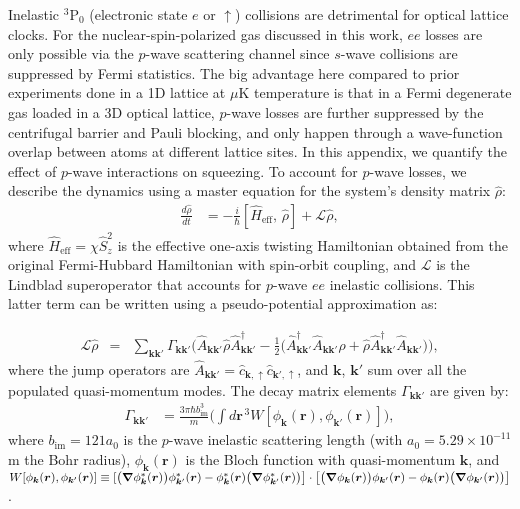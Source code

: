\documentclass[aps,prx,superscriptaddress,notitlepage,twocolumn,longbibliography]{revtex4-1}
\newcommand{\up}{\uparrow}
\begin{document}
Inelastic $^{3}\text{P}_{0}$ (electronic state $e$ or $\up$) collisions are detrimental for optical lattice clocks. For the  nuclear-spin-polarized gas discussed in this work, $ee$ losses are only possible via the $p$-wave scattering channel since $s$-wave collisions are suppressed by Fermi statistics. The big advantage here compared to  prior experiments done in a 1D lattice at $\mu$K temperature\cite{martin2013quantum} is that in a Fermi  degenerate  gas loaded in a 3D optical lattice, $p$-wave losses are further suppressed by the centrifugal barrier and Pauli blocking, and only happen through a wave-function overlap between atoms at different lattice sites.  In this appendix, we quantify the effect of $p$-wave interactions on squeezing. To account for $p$-wave losses, we describe the dynamics  using a master equation for the system's density matrix $\hat{\rho}$:
\begin{align}
\frac{d\hat{\rho}}{dt}&=-\frac{i}{\hbar}[\hat{H}_{\text{eff}},\,\hat{\rho}]+\mathcal{L}\hat{\rho}, 
\end{align}
where $\hat{H}_{\text{eff}}=\chi\hat{S}_z^2$ is the effective one-axis twisting Hamiltonian obtained from  the original Fermi-Hubbard Hamiltonian with spin-orbit coupling, and $\mathcal{L}$ is the Lindblad superoperator that accounts for $p$-wave $ee$ inelastic collisions. This latter term can be written using a pseudo-potential approximation as\cite{rey2014probing}:

\begin{eqnarray}
\mathcal{L}\hat\rho&=&\sum_{{\bm k}{\bm k'} }\Gamma_{{\bm k}{\bm k'} }
\Big(\hat{A}_{{\bm k}{\bm k'}}\hat\rho\hat{A}_{{\bm k}{\bm k'}}^{\dagger}
-\frac{1}{2}\big(\hat{A}_{{\bm k}{\bm k'}}^{\dagger}\hat{A}_{{\bm k}{\bm k'}}\hat\rho
+\hat\rho\hat{A}_{{\bm k}{\bm k'}}^{\dagger}\hat{A}_{{\bm k}{\bm k'}}\big)\Big),\nonumber
\end{eqnarray} where the jump operators are $\hat{A}_{{\bm k}{\bm k'}}=\hat{c}_{{\bm k},\up}\hat{c}_{{\bm k'},\up}$, and
$\bm k$, $\bm k'$ sum over all the populated quasi-momentum modes. The decay matrix elements $\Gamma_{{\bm k}{\bm k'}}$ are given by:
\begin{align}
\Gamma_{{\bm k}{\bm k'}}&=\frac{3\pi \hbar b_{\text{im}}^3 }{m}\Big(\int d{\bm r}^{\,3}
W[\phi_{{\bm k}}({\bm r}),\phi_{{\bm k'}}({\bm r})]\Big),\end{align} where $b_{\text{im}} = 121 a_0$\cite{Zhang2014,goban2018emergence} is the $p$-wave inelastic scattering length (with $ a_0=5.29\times 10 ^{-11}$ m the Bohr radius), $\phi_{{\bm k}}({\bm r})$ is the Bloch function with quasi-momentum ${\bm k}$, and $W[\phi_{{\bm k}}({\bm r}),\phi_{{\bm k'}}({\bm r})]\equiv
[\big({\bm \nabla}\phi^{*}_{{\bm k}}(\bm r)\big)\phi^{*}_{{\bm k'}}(\bm r)
-\phi^{*}_{{\bm k}}(\bm r)\big({\bm \nabla}\phi^{*}_{{\bm k'}}(\bm r)\big)\big]\nonumber\\
\cdot\big[\big({\bm \nabla}\phi_{{\bm k}}(\bm r)\big)\phi_{{\bm k'}}(\bm r)
-\phi_{{\bm k}}(\bm r)\big({\bm \nabla}\phi_{{\bm k'}}(\bm r)\big)\big]$.
\end{document}
